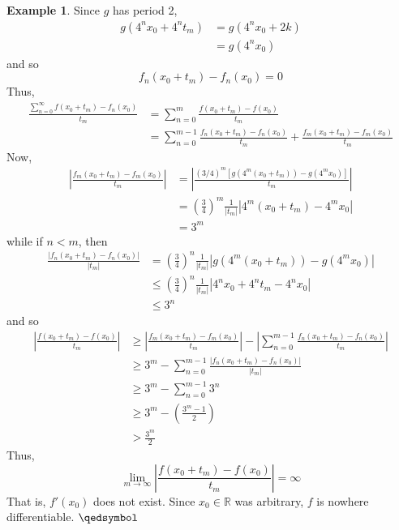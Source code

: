 \documentclass[11pt]{article}
\theoremstyle{definition}
\newtheorem{exmp}[thm]{Example}
\newcommand{\mbR}{\ensuremath{\mathbb{R}}}
\begin{document}
\begin{exmp}
Since $g$ has period 2,
\begin{align*}
g(4^n x_0 + 4^n t_m) & = g(4^n x_0 + 2k) \\
& = g(4^n x_0)
\end{align*}
and so
$$f_n(x_0 + t_m) - f_n(x_0) = 0$$
Thus,
\begin{align*}
\frac{\sum_{n=0}^\infty f(x_0 + t_m) - f_n(x_0)}{t_m} 
& = \sum_{n=0}^m \frac{f(x_0 + t_m) - f(x_0)}{t_m} \\
& = \sum_{n=0}^{m-1} \frac{f_n(x_0 + t_m) - f_n(x_0)}{t_m} + \frac{f_m(x_0 + t_m) - f_m(x_0)}{t_m}
\end{align*}
Now,
\begin{align*}
\left| \frac{f_m(x_0 + t_m) - f_m(x_0)}{t_m} \right|
& = \left| \frac{(3/4)^m \left[ g\left(4^m(x_0 + t_m)\right) - g(4^m x_0)\right]}{t_m} \right| \\
& = \left(\frac34\right)^m \frac{1}{|t_m|} |4^m(x_0 + t_m) - 4^mx_0| \\
& = 3^m
\end{align*}
while if $n < m$, then
\begin{align*}
\frac{|f_n(x_0 + t_m) - f_n(x_0)|}{|t_m|}
& = \left(\frac34\right)^n \frac{1}{|t_m|} \left| g\left(4^m(x_0 + t_m)\right) - g(4^m x_0) \right| \\
& \leq \left(\frac34\right)^n \frac{1}{|t_m|} |4^n x_0 + 4^n t_m - 4^n x_0| \\
& \leq 3^n
\end{align*}
and so
\begin{align*}
\left| \frac{f(x_0 + t_m) - f(x_0)}{t_m} \right|
& \geq \left| \frac{f_m(x_0 + t_m) - f_m(x_0)}{t_m} \right| - \left| \sum_{n=0}^{m-1} \frac{f_n(x_0 + t_m) - f_n(x_0)}{t_m} \right| \\
& \geq 3^m - \sum_{n=0}^{m-1} \frac{|f_n(x_0 + t_m) - f_n(x_0)|}{|t_m|} \\
& \geq 3^m - \sum_{n=0}^{m-1} 3^n \\
& \geq 3^m - \left( \frac{3^m - 1}2 \right) \\
& > \frac{3^m}2
\end{align*}
Thus,
$$\lim_{m\to\infty} \left| \frac{f(x_0 + t_m) - f(x_0)}{t_m} \right| = \infty$$
That is, $f'(x_0)$ does not exist.
Since $x_0 \in \mbR$ was arbitrary, $f$ is nowhere differentiable. $\qedsymbol$
\end{exmp}
\end{document}
